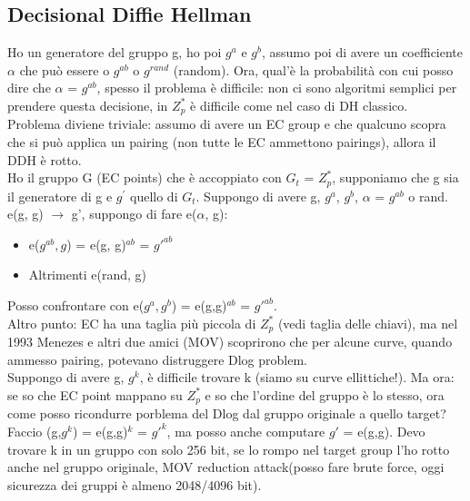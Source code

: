 \documentclass[16px]{article}
\begin{document}
\subsection{Decisional Diffie Hellman}
Ho un generatore del gruppo g, ho poi $g^a$ e $g^b$, assumo poi di avere un coefficiente $\alpha$ che può essere o $g^{ab}$ o $g^{rand}$ (random). Ora, qual'è la probabilità con cui posso dire che $\alpha$ = $g^{ab}$, spesso il problema è difficile: non ci sono algoritmi semplici per prendere questa decisione, in $Z_p^*$ è difficile come nel caso di DH classico.\\ Problema diviene triviale: assumo di avere un EC group e che qualcuno scopra che si può applica un pairing (non tutte le EC ammettono pairings), allora il DDH è rotto.\\ Ho il gruppo G (EC points) che è accoppiato con $G_t$ = $Z_p^*$, supponiamo che g sia il generatore di g e $g^{'}$ quello di $G_t$. Suppongo di avere g, $g^a$, $g^b$, $\alpha$ = $g^{ab}$ o rand. e(g, g) $\rightarrow$ g', suppongo di fare e($\alpha$, g):
\begin{itemize}
\item e($g^{ab}, g$) = e(g, g)$^{ab}$ = $g'^{ab}$
\item Altrimenti e(rand, g)
\end{itemize}
Posso confrontare con e($g^a, g^b$) = e(g,g)$^{ab}$ = $g'^{ab}$.\\ Altro punto: EC ha una taglia più piccola di $Z_p^*$ (vedi taglia delle chiavi), ma nel 1993 Menezes e altri due amici (MOV) scoprirono che per alcune curve, quando ammesso pairing, potevano distruggere Dlog problem.\\ Suppongo di avere g, $g^k$, è difficile trovare k (siamo su curve ellittiche!). Ma ora: se so che EC point mappano su $Z_p^*$ e so che l'ordine del gruppo è lo stesso, ora come posso ricondurre porblema del Dlog dal gruppo originale a quello target? Faccio (g,$g^k$) = e(g,g)$^k$ = $g'^k$, ma posso anche computare $g'$ = e(g,g). Devo trovare k in un gruppo con solo 256 bit, se lo rompo nel target group l'ho rotto anche nel gruppo originale, MOV reduction attack(posso fare brute force, oggi sicurezza dei gruppi è almeno 2048/4096 bit).
\end{document}
